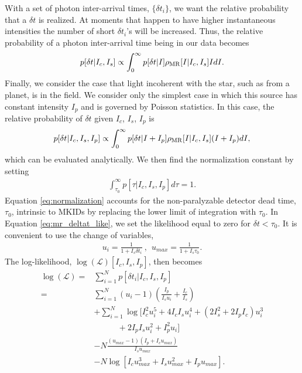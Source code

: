 \documentclass[../main.tex]{subfiles}
\begin{document}
With a set of photon inter-arrival times, $\{\delta t_{i}\}$, we want the relative probability that a $\delta t$ is realized. At moments that happen to have higher instantaneous intensities the number of short $\delta t_{i}$'s will be increased. Thus, the relative probability of a photon inter-arrival time being in our data becomes
\begin{equation}
\begin{aligned}
p[\delta t | I_c, I_s] \propto \int_{0}^{\infty} p[\delta t | I] \rho_{\rm MR} [I | I_c, I_s] I dI.
\end{aligned}
\end{equation}
Finally, we consider the case that light incoherent with the star, such as from a planet, is in the field. We consider only the simplest case in which this source has constant intensity $I_p$ and is governed by Poisson statistics. In this case, the relative probability of $\delta t$ given $I_c$, $I_s$, $I_p$ is
\begin{equation}
\begin{aligned}
p[\delta t | I_c, I_s, I_p] \propto \int_{0}^{\infty} p[\delta t | I + I_p] \rho_{\rm MR} [I | I_c, I_s] (I + I_p) dI,
\label{eq:mr_deltat_like}
\end{aligned}
\end{equation}
which can be evaluated analytically. We then find the normalization constant by setting
\begin{equation}
\begin{aligned}
\int_{\tau_{0}}^{\infty} p[\tau | I_c, I_s, I_p] d\tau = 1.
\end{aligned}
\label{eq:normalization}
\end{equation}
Equation \eqref{eq:normalization} accounts for the non-paralyzable detector dead time, $\tau_0$, intrinsic to MKIDs by replacing the lower limit of integration with $\tau_0$. In Equation \eqref{eq:mr_deltat_like}, we set the likelihood equal to zero for $\delta t < \tau_0$. It is convenient to use the change of variables,
\begin{equation}
\begin{aligned}
u_i=\frac{1}{1+I_s \delta t_i}~,~~u_{max}=\frac{1}{1+I_s \tau_0}.
\end{aligned}
\end{equation}
The log-likelihood, $\log(\mathcal{L})[I_c, I_s, I_p]$, then becomes
\begin{align}\label{equ:binfreeLogL}
    \log(\mathcal{L})=& \sum_{i=1}^{N} p[\delta t_i | I_c, I_s, I_p] \nonumber\\
    =&\sum_{i=1}^{N}(u_i - 1) \left(\frac{I_p}{I_s u_i}+\frac{I_c}{I_s} \right)  \nonumber\\
    &+\sum_{i=1}^{N} \log\big[I_c^2 u_i^5 + 4 I_c I_s u_i^4 + (2 I_s^2 + 2 I_p I_c)u_i^3 \nonumber\\[-10pt]
    &~~~~~~~~~~~~~+ 2 I_p I_s u_i^2 + I_p^2 u_i\big]  \nonumber\\[3pt]
    &-N \frac{(u_{max}-1)(I_p + I_c u_{max})}{I_s u_{max}}  \nonumber\\[2pt]
    &-N \log\left[I_c u_{max}^3 + I_s u_{max}^2 + I_p u_{max}\right] .
\end{align}
\end{document}
